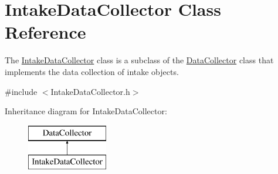 \hypertarget{classIntakeDataCollector}{}\section{Intake\+Data\+Collector Class Reference}
\label{classIntakeDataCollector}


The {\ttfamily \mbox{\hyperlink{classIntakeDataCollector}{Intake\+Data\+Collector}}} class is a subclass of the {\ttfamily \mbox{\hyperlink{classDataCollector}{Data\+Collector}}} class that implements the data collection of intake objects.  




{\ttfamily \#include $<$Intake\+Data\+Collector.\+h$>$}

Inheritance diagram for Intake\+Data\+Collector\+:\begin{figure}[H]
\begin{center}
\leavevmode
\includegraphics[height=2.000000cm]{classIntakeDataCollector}
\end{center}
\end{figure}
